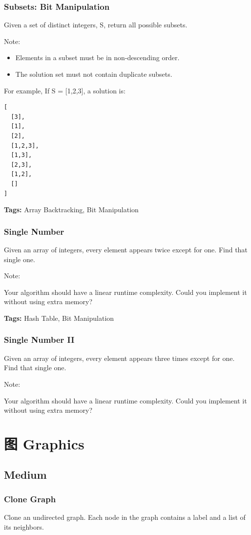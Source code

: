 \documentclass[12pt]{book}
\begin{document}
\subsection{Subsets: Bit Manipulation}
\label{sec-17-2-1}
Given a set of distinct integers, S, return all possible subsets.

Note:
\begin{itemize}
\item Elements in a subset must be in non-descending order.
\item The solution set must not contain duplicate subsets.
\end{itemize}
For example,
If S = [1,2,3], a solution is:
\lstset{language=java,label= ,caption= ,numbers=none}
\begin{lstlisting}
[
  [3],
  [1],
  [2],
  [1,2,3],
  [1,3],
  [2,3],
  [1,2],
  []
]
\end{lstlisting}
\textbf{Tags:} Array Backtracking, Bit Manipulation
\subsection{Single Number}
\label{sec-17-2-2}
Given an array of integers, every element appears twice except for one. Find that single one.

Note:

Your algorithm should have a linear runtime complexity. Could you implement it without using extra memory?

\textbf{Tags:} Hash Table, Bit Manipulation

\subsection{Single Number II}
\label{sec-17-2-3}
Given an array of integers, every element appears three times except for one. Find that single one.

Note:

Your algorithm should have a linear runtime complexity. Could you implement it without using extra memory?

\chapter{图 Graphics}
\label{sec-18}
\section{Medium}
\label{sec-18-1}
\subsection{Clone Graph}
\label{sec-18-1-1}
Clone an undirected graph. Each node in the graph contains a label and a list of its neighbors.
\end{document}
